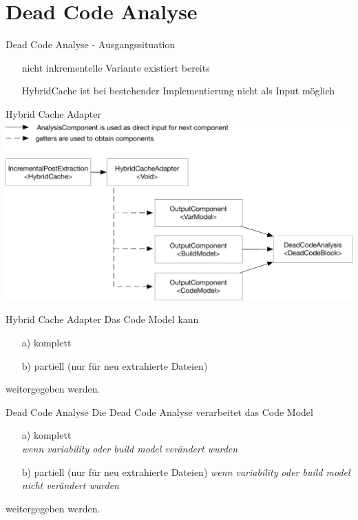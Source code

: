 \documentclass[aspectratio=43, noserifmath]{beamer}
\begin{document}
\section{Dead Code Analyse}
\begin{frame}{Dead Code Analyse - Ausgangssituation}

\begin{itemize}
    \item[\textbullet] nicht inkrementelle Variante existiert bereits
    \item[\textbullet] HybridCache ist bei bestehender Implementierung nicht als Input m\"oglich
\end{itemize}
\end{frame}


\begin{frame}{Hybrid Cache Adapter}
\includegraphics[width=1\textwidth]{image/HybridCacheAdapter.pdf}
\end{frame}

\begin{frame}{Hybrid Cache Adapter}
Das Code Model kann
\begin{itemize}
    \item[a)] komplett
    \item[b)] partiell (nur f\"ur neu extrahierte Dateien)
\end{itemize}
weitergegeben werden.
\end{frame}

\begin{frame}{Dead Code Analyse}
Die Dead Code Analyse verarbeitet das Code Model 
\begin{itemize}
    \item[a)] komplett \\
    \emph{wenn variability oder build model \alert{ver\"andert} wurden}
    \item[b)] partiell (nur f\"ur neu extrahierte Dateien)
    \emph{wenn variability oder build model \alert{nicht ver\"andert} wurden}
\end{itemize}
weitergegeben werden.
\end{frame}
\end{document}
